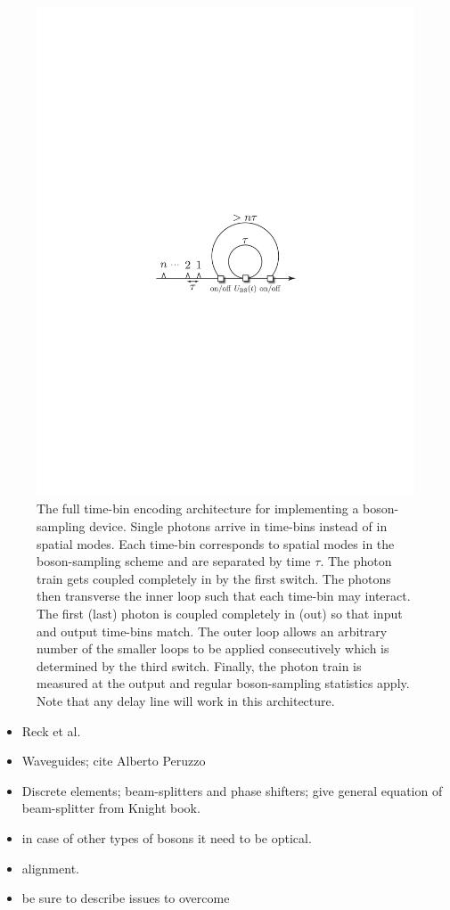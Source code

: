 \documentclass[aps,pra,twocolumn,amsmath,amssymb,nofootinbib,superscriptaddress]{revtex4}
\begin{document}
\begin{figure}[!htb]
\includegraphics[width=0.7\columnwidth]{fiber_loop}
\caption{The full time-bin encoding architecture for implementing a boson-sampling device. Single photons arrive in time-bins instead of in spatial modes. Each time-bin corresponds to spatial modes in the boson-sampling scheme and are separated by time $\tau$. The photon train gets coupled completely in by the first switch. The photons then transverse the inner loop such that each time-bin may interact. The first (last) photon is coupled completely in (out) so that input and output time-bins match. The outer loop allows an arbitrary number of the smaller loops to be applied consecutively which is determined by the third switch. Finally, the photon train is measured at the output and regular boson-sampling statistics apply. Note that any delay line will work in this architecture.}
\label{fig:fiber_loop}
\end{figure}

\begin{itemize}
\item Reck et al.
\item Waveguides; cite Alberto Peruzzo
\item Discrete elements; beam-splitters and phase shifters; give general equation of beam-splitter from Knight book.
\item in case of other types of bosons it need to be optical.
\item alignment.
\item be sure to describe issues to overcome
\end{itemize}
\end{document}
